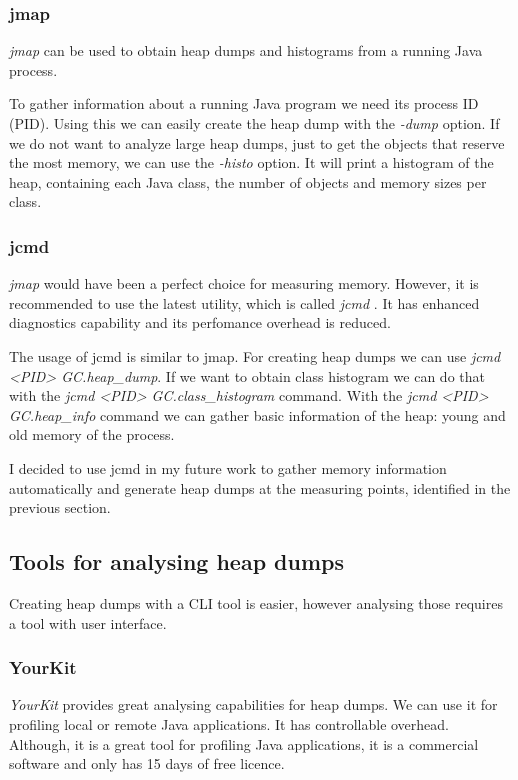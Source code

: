 \subsubsection{jmap}
\textit{jmap} \cite{jmap-jcmd} can be used to obtain heap dumps and histograms from a running Java process.

To gather information about a running Java program we need its process ID (PID). Using this we can easily create the heap dump with the \textit{-dump} option. If we do not want to analyze large heap dumps, just to get the objects that reserve the most memory, we can use the \textit{-histo} option. It will print a histogram of the heap, containing each Java class, the number of objects and memory sizes per class.

\subsubsection{jcmd}
\textit{jmap} would have been a perfect choice for measuring memory. However, it is recommended to use the latest utility, which is called \textit{jcmd} \cite{jmap-jcmd}. It has enhanced diagnostics capability and its perfomance overhead is reduced. 

The usage of jcmd is similar to jmap. For creating heap dumps we can use \textit{jcmd <PID> GC.heap\_dump}. If we want to obtain class histogram we can do that with the \textit{jcmd <PID> GC.class\_histogram} command. With the \textit{jcmd <PID> GC.heap\_info} command we can gather basic information of the heap: \eg young and old memory of the process.

I decided to use jcmd in my future work to gather memory information automatically and generate heap dumps at the measuring points, identified in the previous section.

\subsection{Tools for analysing heap dumps}
Creating heap dumps with a CLI tool is easier, however analysing those requires a tool with user interface. 

\subsubsection{YourKit}
\textit{YourKit} provides great analysing capabilities for heap dumps. We can use it for profiling local or remote Java applications. It has controllable overhead. Although, it is a great tool for profiling Java applications, it is a commercial software and only has 15 days of free licence.

